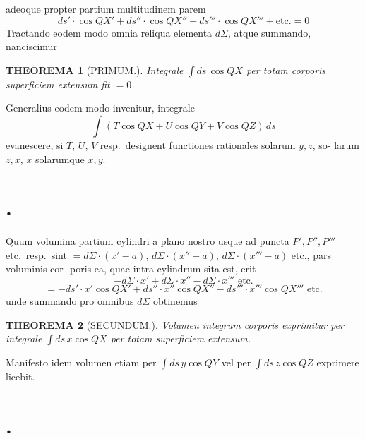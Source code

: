 \documentclass[12pt,a4paper]{article}
\theoremstyle{gauss}
\newtheorem*{theorema}{THEOREMA}
\begin{document}
\newpage
\setcounter{page}{14}

adeoque propter partium multitudinem parem
\[
ds'\cdot\cos QX' + ds''\cdot\cos QX'' + ds'''\cdot\cos QX''' + \text{etc.} = 0
\]
Tractando eodem modo omnia reliqua elementa $d\Sigma$, atque summando,
nanciscimur

\begin{theorema}[PRIMUM.]
Integrale $\int ds\,\cos QX$ per totam corporis superficiem extensum fit $=0$.
\end{theorema}

Generalius eodem modo invenitur, integrale
\[
\int (T\cos QX + U\cos QY + V\cos QZ)\,ds
\]
evanescere, si $T$, $U$, $V$ resp.~designent functiones rationales solarum $y,z$, so-
larum $z,x$, $x$ solarumque $x,y$.

\section*{%
%
\thesection.}

Quum volumina partium cylindri a plano nostro usque ad puncta $P',P'',P'''$
etc.~resp.~sint $=d\Sigma\cdot(x'-a)$, $d\Sigma\cdot(x''-a)$, $d\Sigma\cdot(x'''-a)$ etc., pars voluminis cor-
poris ea, quae intra cylindrum sita est, erit
\[
-d\Sigma \cdot x' + d\Sigma \cdot x'' - d\Sigma \cdot x''' \text{ etc.}
\]
\[
= -ds'\cdot x'\cos QX' + ds''\cdot x''\cos QX'' - ds'''\cdot x'''\cos QX''' \text{ etc.}
\]
unde summando pro omnibus $d\Sigma$ obtinemus

\begin{theorema}[SECUNDUM.]
Volumen integrum corporis exprimitur per integrale $\int ds\,x\cos QX$ per totam
superficiem extensum.
\end{theorema}

Manifesto idem volumen etiam per $\int ds\,y\cos QY$ vel per $\int ds\,z\cos QZ$
exprimere licebit.

\section*{%
%
\thesection.}
\end{document}

